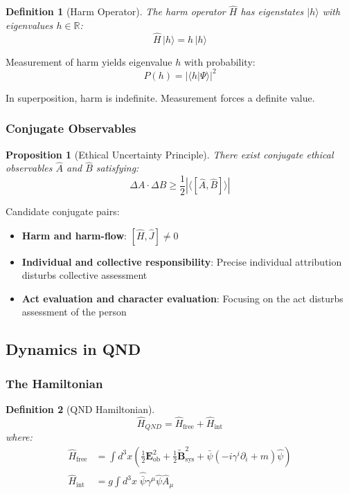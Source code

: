\documentclass[12pt]{article}
\newtheorem{definition}{Definition}[section]
\newtheorem{proposition}{Proposition}[section]
\begin{document}
\begin{definition}[Harm Operator]
The harm operator $\hat{H}$ has eigenstates $|h\rangle$ with eigenvalues $h \in \mathbb{R}$:
\begin{equation}
    \hat{H} \,|h\rangle = h \,|h\rangle
\end{equation}
\end{definition}

Measurement of harm yields eigenvalue $h$ with probability:
\begin{equation}
    P(h) = |\langle h | \Psi \rangle|^2
\end{equation}

In superposition, harm is indefinite. Measurement forces a definite value.

\subsubsection{Conjugate Observables}

\begin{proposition}[Ethical Uncertainty Principle]
\emph{There exist conjugate ethical observables $\hat{A}$ and $\hat{B}$ satisfying:}
\begin{equation}
    \Delta A \cdot \Delta B \geq \frac{1}{2} |\langle [\hat{A}, \hat{B}] \rangle|
\end{equation}
\end{proposition}

Candidate conjugate pairs:
\begin{itemize}
    \item \textbf{Harm and harm-flow}: $[\hat{H}, \hat{J}] \neq 0$
    \item \textbf{Individual and collective responsibility}: Precise individual attribution disturbs collective assessment
    \item \textbf{Act evaluation and character evaluation}: Focusing on the act disturbs assessment of the person
\end{itemize}

\subsection{Dynamics in QND}

\subsubsection{The Hamiltonian}

\begin{definition}[QND Hamiltonian]
\begin{equation}
    \hat{H}_{QND} = \hat{H}_{\text{free}} + \hat{H}_{\text{int}}
\end{equation}
where:
\begin{align}
    \hat{H}_{\text{free}} &= \int d^3x \left( \frac{1}{2} \mathbf{E}_{\text{ob}}^2 + \frac{1}{2} \tilde{\mathbf{B}}_{\text{sys}}^2 + \bar{\psi}(-i\gamma^i \partial_i + m)\hat{\psi} \right) \\
    \hat{H}_{\text{int}} &= g \int d^3x \; \hat{\bar{\psi}} \gamma^\mu \hat{\psi} \hat{A}_\mu
\end{align}
\end{definition}
\end{document}

